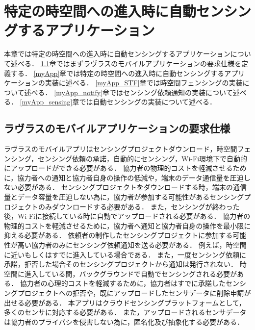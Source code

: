 \chapter{特定の時空間への進入時に自動センシングするアプリケーション}
\thispagestyle{myheadings}
本章では特定の時空間への進入時に自動センシングするアプリケーションについて述べる．
\ref{lavlusReq}章ではまずラヴラスのモバイルアプリケーションの要求仕様を定義する．
\ref{myApp}章では特定の時空間への進入時に自動センシングするアプリケーションの実装に述べる．
\ref{myApp_STF}章では時空間フェンシングの実装について述べる．
\ref{myApp_notify}章ではセンシング依頼通知の実装について述べる．
\ref{myApp_sensing}章では自動センシングの実装について述べる．


\section{ラヴラスのモバイルアプリケーションの要求仕様}
\label{lavlusReq}
ラヴラスのモバイルアプリはセンシングプロジェクトダウンロード，時空間フェンシング，センシング依頼の承諾，自動的にセンシング，Wi-Fi環境下で自動的にアップロードができる必要がある．
協力者の物理的コストを軽減させるために，協力者への通知と協力者自身の操作の低減や，端末のデータ通信量を圧迫しない必要がある．
センシングプロジェクトをダウンロードする時，端末の通信量とデータ容量を圧迫しない為に，協力者が参加する可能性があるセンシングプロジェクトのみダウンロードする必要がある．
また，センシングが終わった後，Wi-Fiに接続している時に自動でアップロードされる必要がある．
協力者の物理的コストを軽減させるために，協力者へ通知と協力者自身の操作を最小限に抑える必要がある．
依頼者の制作したセンシングプロジェクトに参加する可能性が高い協力者のみにセンシング依頼通知を送る必要がある．
例えば，時空間に近いもしくはすでに進入している場合である．
また，一度センシング依頼に承諾，拒否した場合そのセンシングプロジェクトから通知は発行されない．
時空間に進入している間，バックグラウンドで自動でセンシングされる必要がある．
協力者の心理的コストを軽減するために，協力者はすでに承諾したセンシングプロジェクトへの拒否や，既にアップロードしたセンサデータに削除申請が出せる必要がある．
本アプリはクラウドセンシングプラットフォームとして，多くのセンサに対応する必要がある．
また，アップロードされるセンサデータは協力者のプライバシを侵害しない為に，匿名化及び抽象化する必要がある．




